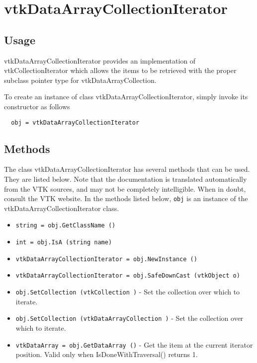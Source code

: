 \section{vtkDataArrayCollectionIterator}

\subsection{Usage}

 vtkDataArrayCollectionIterator provides an implementation of
 vtkCollectionIterator which allows the items to be retrieved with
 the proper subclass pointer type for vtkDataArrayCollection.

To create an instance of class vtkDataArrayCollectionIterator, simply
invoke its constructor as follows
\begin{verbatim}
  obj = vtkDataArrayCollectionIterator
\end{verbatim}
\subsection{Methods}

The class vtkDataArrayCollectionIterator has several methods that can be used.
  They are listed below.
Note that the documentation is translated automatically from the VTK sources,
and may not be completely intelligible.  When in doubt, consult the VTK website.
In the methods listed below, \verb|obj| is an instance of the vtkDataArrayCollectionIterator class.
\begin{itemize}
\item  \verb|string = obj.GetClassName ()|

\item  \verb|int = obj.IsA (string name)|

\item  \verb|vtkDataArrayCollectionIterator = obj.NewInstance ()|

\item  \verb|vtkDataArrayCollectionIterator = obj.SafeDownCast (vtkObject o)|

\item  \verb|obj.SetCollection (vtkCollection )| -  Set the collection over which to iterate.

\item  \verb|obj.SetCollection (vtkDataArrayCollection )| -  Set the collection over which to iterate.

\item  \verb|vtkDataArray = obj.GetDataArray ()| -  Get the item at the current iterator position.  Valid only when
 IsDoneWithTraversal() returns 1.

\end{itemize}
